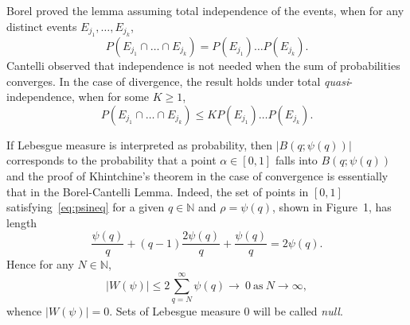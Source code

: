 \documentclass[reqno]{amsart}
\renewcommand{\ge}{\geqslant}
\renewcommand{\le}{\leqslant}
\newcommand{\al}{\alpha}
\newcommand{\N}{{\mathbb{N}}}
\newcommand{\0}{{\mathbf{0}}}
\newcommand{\K}{Khintchine}
\def\Bqp{B(q;\psi(q))}
\begin{document}
Borel proved the lemma assuming total independence of the events, when 
for any distinct events $E_{j_1},\dots,E_{j_k}$,
\begin{equation*}
P (E_{j_1}\cap  \dots
\cap E_{j_k})=P(E_{j_1}) \dots  P(E_{j_k}).
\end{equation*}
Cantelli observed that independence is not needed when the sum of
probabilities converges.  In the case of divergence, the result holds
under total {\it quasi}-independence, when for some $K\ge1$,
\begin{equation*}
P (E_{j_1}\cap  \dots
\cap E_{j_k})\le K P(E_{j_1}) \dots  P(E_{j_k}).
\end{equation*}



If Lebesgue measure is interpreted as probability, then
$|\Bqp|$ 
corresponds to the probability that a point $\al\in [0,1]$ falls into
$\Bqp$ and the proof of \K's theorem in the case of convergence is
essentially that in the Borel-Cantelli Lemma. Indeed, the set of
points in $[0,1]$ satisfying~\eqref{eq:psineq} for a given $q\in\N$
and $\rho=\psi(q)$, shown in Figure~1, has length
\begin{equation*}
  \frac{\psi(q)}{q} + (q-1) \frac{2\psi(q)}{q} + \frac{\psi(q)}{q} 
=   2\psi(q). 
\end{equation*}
Hence for any $N\in \N$, 
\begin{equation*}
  |W(\psi)|\le 2 \sum_{q=N}^\infty  \psi(q) \to \ 0 \ {\text{as}} \ N\to\infty,
\end{equation*}
whence $|W(\psi)|=0$. Sets of Lebesgue measure 0 will be called
\emph{null}. 
\end{document}
